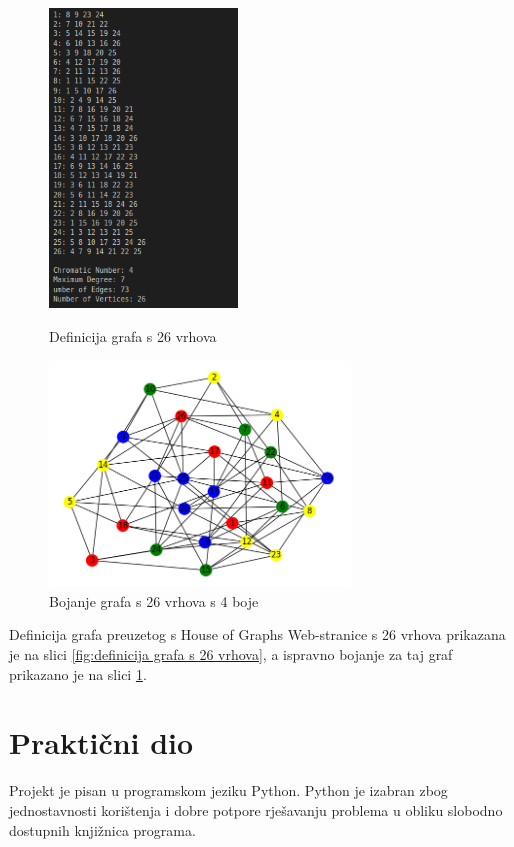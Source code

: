 \documentclass[times, utf8, zavrsni, numeric]{fer}
\begin{document}
\begin{figure}[h]
\centering
\begin{minipage}{.5\textwidth}
  \centering
  \includegraphics[width=5cm]{images/26_vertices_graph_definition.png}
  \caption{Definicija grafa s 26 vrhova}
  \label{fig:definicija grafa s 26 vrhova}
\end{minipage}%
\begin{minipage}{.5\textwidth}
  \centering
  \includegraphics[width=8cm]{images/26_vertices_graph.png}
  \caption{Bojanje grafa s 26 vrhova s 4 boje}
  \label{fig:obojani graf s 26 vrhova}
\end{minipage}
\end{figure}

Definicija grafa preuzetog s House of Graphs Web-stranice s 26 vrhova prikazana je na slici \ref{fig:definicija grafa s 26 vrhova}, a ispravno bojanje za taj graf prikazano je na slici \ref{fig:obojani graf s 26 vrhova}.


\chapter{Praktični dio}
Projekt je pisan u programskom jeziku Python. Python je izabran zbog jednostavnosti korištenja i dobre potpore rješavanju problema u obliku slobodno dostupnih knjižnica programa.
\end{document}
